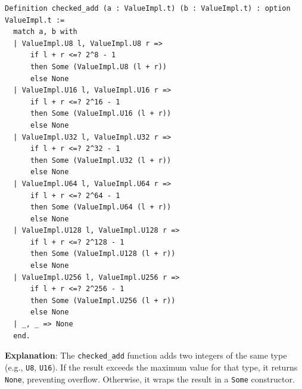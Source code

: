 \documentclass[english, 12pt, a4paper, biz, utf8, a-2b, online]{aaltothesis}
\begin{document}
\begin{tcolorbox}[
  colback=white,     %
  colframe=white,    %
  boxrule=0pt,       %
  sharp corners,     %
  boxsep=0pt,        %
  left=0pt,          %
  right=0pt,         %
  top=0pt,           %
  bottom=0pt         %
]
\begin{lstlisting}[caption={Checked Addition \texttt{checked\_add}},captionpos=b]
Definition checked_add (a : ValueImpl.t) (b : ValueImpl.t) : option ValueImpl.t :=
  match a, b with
  | ValueImpl.U8 l, ValueImpl.U8 r =>
      if l + r <=? 2^8 - 1
      then Some (ValueImpl.U8 (l + r))
      else None
  | ValueImpl.U16 l, ValueImpl.U16 r =>
      if l + r <=? 2^16 - 1
      then Some (ValueImpl.U16 (l + r))
      else None
  | ValueImpl.U32 l, ValueImpl.U32 r =>
      if l + r <=? 2^32 - 1
      then Some (ValueImpl.U32 (l + r))
      else None
  | ValueImpl.U64 l, ValueImpl.U64 r =>
      if l + r <=? 2^64 - 1
      then Some (ValueImpl.U64 (l + r))
      else None
  | ValueImpl.U128 l, ValueImpl.U128 r =>
      if l + r <=? 2^128 - 1
      then Some (ValueImpl.U128 (l + r))
      else None
  | ValueImpl.U256 l, ValueImpl.U256 r =>
      if l + r <=? 2^256 - 1
      then Some (ValueImpl.U256 (l + r))
      else None
  | _, _ => None
  end.
\end{lstlisting}
\end{tcolorbox}
\clearpage
\textbf{Explanation}: The \texttt{checked\_add} function adds two integers of the same type (e.g., \texttt{U8}, \texttt{U16}). If the result exceeds the maximum value for that type, it returns \texttt{None}, preventing overflow. Otherwise, it wraps the result in a \texttt{Some} constructor.
\end{document}
